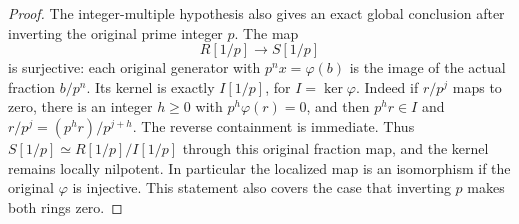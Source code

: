 \begin{proof}
The integer-multiple hypothesis
also gives an exact global conclusion
after inverting the original prime
integer $p$. The map
$$
R[1/p]\longrightarrow S[1/p]
$$
is surjective: each original
generator with $p^n x=\varphi(b)$
is the image of the actual fraction
$b/p^n$. Its kernel is exactly
$I[1/p]$, for $I=\ker\varphi$.
Indeed if $r/p^j$ maps to zero,
there is an integer $h\geq0$
with $p^h\varphi(r)=0$, and then
$p^h r\in I$ and
$r/p^j=(p^h r)/p^{j+h}$.
The reverse containment is immediate.
Thus
$S[1/p]\simeq R[1/p]/I[1/p]$
through this original fraction map,
and the kernel remains locally
nilpotent. In particular the
localized map is an isomorphism
if the original $\varphi$ is
injective. This statement also
covers the case that inverting
$p$ makes both rings zero.
\end{proof}
